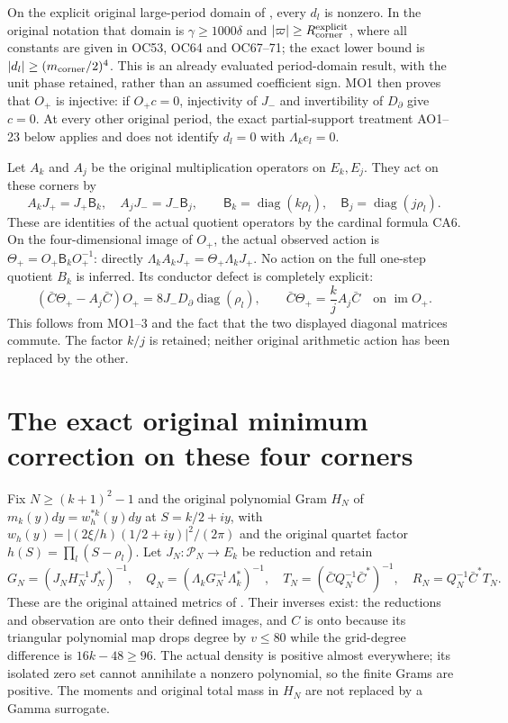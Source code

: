 \documentclass[11pt]{article}
\newcommand{\diag}{\operatorname{diag}}
\begin{document}
On the explicit original large-period domain of
\cite[OC50--74]{CornerNonzero}, every $d_l$ is nonzero. In the
original notation that domain is $\gamma\ge1000\delta$ and
$|\varpi|\ge R_{\rm corner}^{\rm explicit}$, where all constants
are given in OC53, OC64 and OC67--71; the exact lower bound is
$|d_l|\ge(m_{\rm corner}/2)^4$. This is an already evaluated
period-domain result, with the unit phase retained, rather than
an assumed coefficient sign. MO1 then proves that $O_+$ is
injective: if $O_+c=0$, injectivity of $J_-$ and invertibility
of $D_\partial$ give $c=0$. At every other original period,
the exact partial-support treatment AO1--23 below applies and
does not identify $d_l=0$ with $\Lambda_ke_l=0$.

Let $A_k$ and $A_j$ be the original multiplication operators
on $E_k,E_j$. They act on these corners by
\[
 A_kJ_+=J_+ \mathsf B_k,\quad A_jJ_-=J_-\mathsf B_j,\qquad
 \mathsf B_k=\diag(k\rho_l),\quad \mathsf B_j=\diag(j\rho_l).
 \tag{MO3}
\]
These are identities of the actual quotient operators by the
cardinal formula CA6. On the four-dimensional image of $O_+$,
the actual observed action is
$\Theta_+=O_+\mathsf B_kO_+^{-1}$: directly
$\Lambda_kA_kJ_+=\Theta_+\Lambda_kJ_+$.
No action on the full one-step quotient $B_k$ is inferred.
Its conductor defect is completely explicit:
\[
 (\bar C\Theta_+-A_j\bar C)O_+
       =8J_-D_\partial\diag(\rho_l),\qquad
 \bar C\Theta_+=\frac{k}{j}A_j\bar C
                 \quad\text{on }\operatorname{im}O_+.
 \tag{MO4}
\]
This follows from MO1--3 and the fact that the two displayed
diagonal matrices commute. The factor $k/j$ is retained;
neither original arithmetic action has been replaced by the other.

\section{The exact original minimum correction on these four corners}
Fix $N\ge(k+1)^2-1$ and the original polynomial Gram $H_N$
of $m_k(y)dy=w_h^{*k}(y)dy$ at $S=k/2+iy$, with
$w_h(y)=|(2\xi/h)(1/2+iy)|^2/(2\pi)$ and the original
quartet factor $h(S)=\prod_l(S-\rho_l)$.
Let $J_N:\mathcal P_N\to E_k$ be reduction and retain
\[
 G_N=(J_NH_N^{-1}J_N^*)^{-1},\quad
 Q_N=(\Lambda_kG_N^{-1}\Lambda_k^*)^{-1},\quad
 T_N=(\bar C Q_N^{-1}\bar C^*)^{-1},\quad
 R_N=Q_N^{-1}\bar C^*T_N. \tag{MO5}
\]
These are the original attained metrics of \cite[EQ1--5]{EightMinimum}.
Their inverses exist: the reductions and observation are onto their
defined images, and $C$ is onto because its triangular polynomial
map drops degree by $v\le80$ while the grid-degree difference is
$16k-48\ge96$. The actual density is positive almost everywhere;
its isolated zero set cannot annihilate a nonzero polynomial, so
the finite Grams are positive. The moments and original total mass
in $H_N$ are not replaced by a Gamma surrogate.
\end{document}
